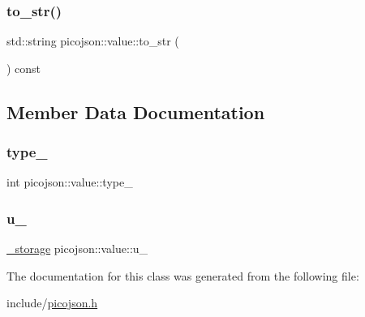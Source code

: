 \hypertarget{classpicojson_1_1value_a005099b2865752cf31b7ced33bd85f59}{}\label{classpicojson_1_1value_a005099b2865752cf31b7ced33bd85f59} 
\subsubsection{\texorpdfstring{to\+\_\+str()}{to\_str()}}
{\footnotesize\ttfamily std\+::string picojson\+::value\+::to\+\_\+str (\begin{DoxyParamCaption}{ }\end{DoxyParamCaption}) const\hspace{0.3cm}{\ttfamily [inline]}}



\subsection{Member Data Documentation}
\hypertarget{classpicojson_1_1value_af77ae4525a20f6fce6ea9ff1c4709312}{}\label{classpicojson_1_1value_af77ae4525a20f6fce6ea9ff1c4709312} 
\subsubsection{\texorpdfstring{type\+\_\+}{type\_}}
{\footnotesize\ttfamily int picojson\+::value\+::type\+\_\+\hspace{0.3cm}{\ttfamily [protected]}}

\hypertarget{classpicojson_1_1value_aa7948fe10fcbc19ab9c8dee5e5099f77}{}\label{classpicojson_1_1value_aa7948fe10fcbc19ab9c8dee5e5099f77} 
\subsubsection{\texorpdfstring{u\+\_\+}{u\_}}
{\footnotesize\ttfamily \hyperlink{unionpicojson_1_1value_1_1__storage}{\+\_\+storage} picojson\+::value\+::u\+\_\+\hspace{0.3cm}{\ttfamily [protected]}}



The documentation for this class was generated from the following file\+:\begin{DoxyCompactItemize}
\item 
include/\hyperlink{picojson_8h}{picojson.\+h}\end{DoxyCompactItemize}
